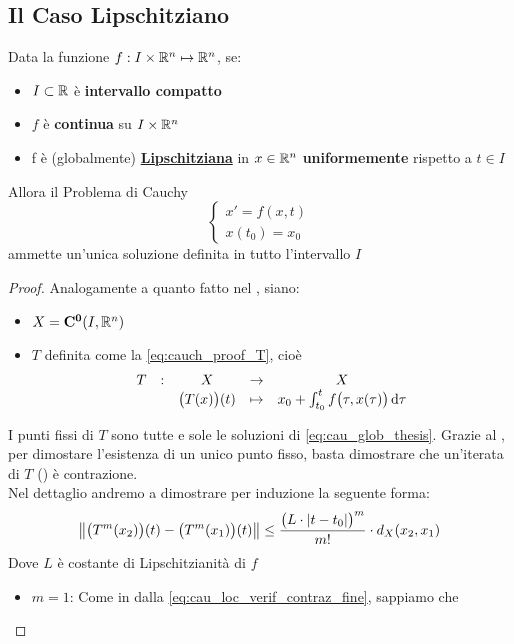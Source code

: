 \color{not_explained_section_color}
\subsection{Il Caso Lipschitziano}
\begin{theorem}
	\label{teo:cau_glob_lips}
	Data la funzione $f:I \times \mathbb{R}^n \mapsto \mathbb{R}^n$, se:
	\begin{itemize}
		\item $I \subset \mathbb{R}$ è \textbf{intervallo compatto}
		\item $f$ è \textbf{continua} su $I \times \mathbb{R}^n$
		\item f è (globalmente) \hyperref[def:lips]{\textbf{Lipschitziana}} in $x \in \mathbb{R}^n$ \textbf{uniformemente} rispetto a $t \in I$
	\end{itemize}
	Allora il Problema di Cauchy
	\begin{equation}
		\label{eq:cau_glob_thesis}
		\begin{cases}
			x' = f(x,t)\\
			x(t_0) = x_0
		\end{cases}
	\end{equation}
	ammette un'unica soluzione definita in tutto l'intervallo $I$
	\begin{proof}
		Analogamente a quanto fatto nel , siano:
		\begin{itemize}
			\item $X = \mathbf{C^{0}}(I,\mathbb{R}^n)$
			\item $T$ definita come la \cref{eq:cauch_proof_T}, cioè
			$$\begin{array}{ccccc} {T} & : & {X} & \to & {X} \\ & & { \bigl(T(x)\bigr)(t) } & \mapsto & { x_0+\int_{t_0}^tf\bigl(\tau,x(\tau)\bigr)\,\mathrm{d}{\tau} } \\ \end{array}$$
		\end{itemize}
		I punti fissi di $T$ sono tutte e sole le soluzioni di \cref{eq:cau_glob_thesis}. Grazie al , per dimostare l'esistenza di un unico punto fisso, basta dimostrare che un'iterata di $T$ () è contrazione.\\
		Nel dettaglio andremo a dimostrare per induzione la seguente forma:
		\begin{equation}
			\left\|\bigl(T^m(x_2)\bigr)(t) - \bigl(T^m(x_1)\bigr)(t)\right\| \leq \frac{\bigl(L \cdot \left|t-t_0\right|\bigr)^m}{m!} \cdot d_X(x_2,x_1)
		\end{equation}
		Dove $L$ è costante di Lipschitzianità di $f$\\
		\begin{itemize}
			\item $m=1$: Come in dalla \cref{eq:cau_loc_verif_contraz_fine}, sappiamo che

\end{itemize}
\end{proof}
\end{theorem}
